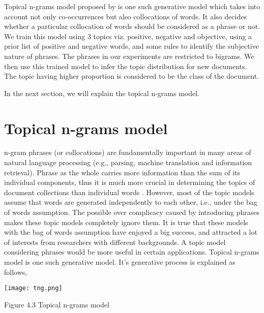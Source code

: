 Topical n-grams model proposed by \citep*{wang2007topical} is one such generative model which takes into account not only co-occurrences but also collocations of words. It
also decides whether a particular collocation of words should be considered as a phrase or not. We train this model using 3 topics viz. positive, negative and objective, 
using a prior list of positive and negative words, and some rules to identify the subjective nature of phrases. The phrases in our experiments are restricted to bigrams. We
then use this trained model to infer the topic distribution for new documents. The topic having higher proportion is considered to be the class of the document.

In the next section, we will explain the topical n-grams model.

\section{Topical n-grams model}

n-gram phrases (or collocations) are fundamentally important in many areas of natural language processing (e.g., parsing, machine translation and information retrieval). 
Phrase as the whole carries more information than the sum of its individual components, thus it is much more crucial in determining the topics of document collections than
individual words \citep*{wang2005note}. However, most of the topic models assume that words are generated independently to each other, i.e., under the bag of words assumption.
The possible over complicacy caused by introducing phrases makes these topic models completely ignore them. It is true that these models with the bag of words assumption have
enjoyed a big success, and attracted a lot of interests from researchers with different backgrounds. A topic model considering phrases would be more useful in certain 
applications. Topical n-grams model is one such generative model. It's generative process is explained as follows,


\texttt{[image: tng.png]} 
\begin{center}
 Figure 4.3 Topical n-grams model
\end{center}

